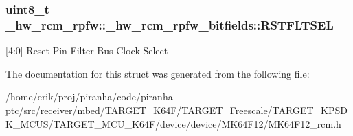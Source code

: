 \subsubsection[{\texorpdfstring{R\+S\+T\+F\+L\+T\+S\+EL}{RSTFLTSEL}}]{\setlength{\rightskip}{0pt plus 5cm}uint8\+\_\+t \+\_\+hw\+\_\+rcm\+\_\+rpfw\+::\+\_\+hw\+\_\+rcm\+\_\+rpfw\+\_\+bitfields\+::\+R\+S\+T\+F\+L\+T\+S\+EL}\hypertarget{struct__hw__rcm__rpfw_1_1__hw__rcm__rpfw__bitfields_a7c9026508ef6db9e0ff619c84ec579ec}{}\label{struct__hw__rcm__rpfw_1_1__hw__rcm__rpfw__bitfields_a7c9026508ef6db9e0ff619c84ec579ec}
\mbox{[}4\+:0\mbox{]} Reset Pin Filter Bus Clock Select 

The documentation for this struct was generated from the following file\+:\begin{DoxyCompactItemize}
\item 
/home/erik/proj/piranha/code/piranha-\/ptc/src/receiver/mbed/\+T\+A\+R\+G\+E\+T\+\_\+\+K64\+F/\+T\+A\+R\+G\+E\+T\+\_\+\+Freescale/\+T\+A\+R\+G\+E\+T\+\_\+\+K\+P\+S\+D\+K\+\_\+\+M\+C\+U\+S/\+T\+A\+R\+G\+E\+T\+\_\+\+M\+C\+U\+\_\+\+K64\+F/device/device/\+M\+K64\+F12/M\+K64\+F12\+\_\+rcm.\+h\end{DoxyCompactItemize}
